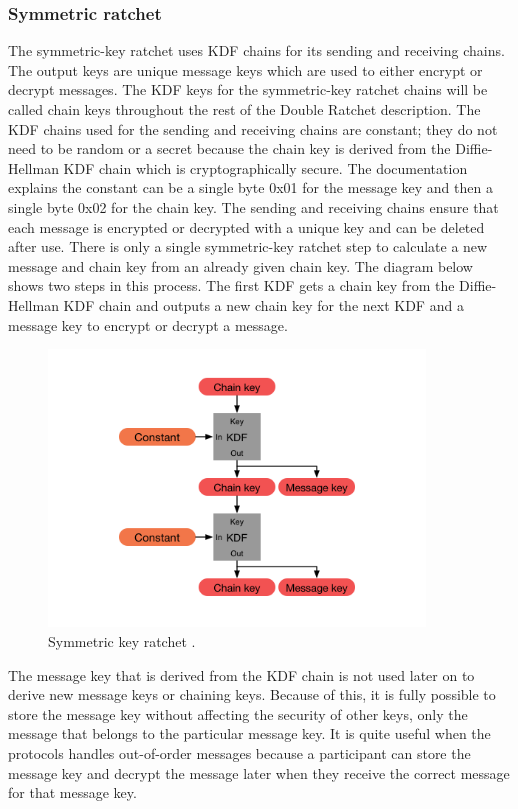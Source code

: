 \subsubsection{Symmetric ratchet}
The symmetric-key ratchet uses KDF chains for its sending and receiving
chains. The output keys are unique message keys which are used to either
encrypt or decrypt messages. The KDF keys for the symmetric-key ratchet
chains will be called chain keys throughout the rest of the Double Ratchet
description.
The KDF chains used for the sending and receiving chains are constant;
they do not need to be random or a secret because the chain key is derived
from the Diffie-Hellman KDF chain which is cryptographically secure. The
documentation explains the constant can be a single byte 0x01 for the
message key and then a single byte 0x02 for the chain key. The sending
and receiving chains ensure that each message is encrypted or decrypted
with a unique key and can be deleted after use. There is only a single
symmetric-key ratchet step to calculate a new message and chain key from
an already given chain key. The diagram below shows two steps in this
process. The first KDF gets a chain key from the Diffie-Hellman KDF chain
and outputs a new chain key for the next KDF and a message key to encrypt
or decrypt a message.

\begin{figure}[H]
	\centering
	\includegraphics[width=10cm]{figures/symmetrickeyratchet.png}
	\caption{Symmetric key ratchet \cite{doubleratchet}.}
	\label{fig:symkeyratchet}
\end{figure}

The message key that is derived from the KDF chain is not used later on to derive new message keys or chaining keys. Because of this, it is fully
possible to store the message key without affecting the security of other
keys, only the message that belongs to the particular message key. It is
quite useful when the protocols handles out-of-order messages because a
participant can store the message key and decrypt the message later when
they receive the correct message for that message key.

